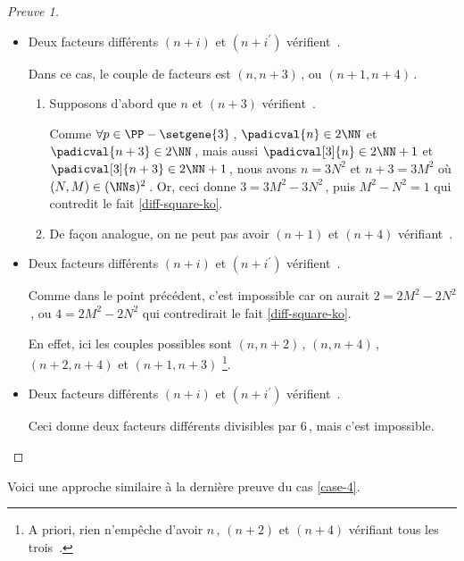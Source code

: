 \begin{proof}[Preuve 1]
\begin{itemize}
    	\medskip
		\item Deux facteurs différents $(n+i)$ et $(n+i^\prime)$ vérifient \,.
		
		\smallskip
		\noindent
		Dans ce cas, le couple de facteurs est $(n, n + 3)$\,, ou $(n + 1, n + 4)$\,.    
		\begin{enumerate}
			\item Supposons d'abord que $n$ et $(n+3)$ vérifient \,.
			
			\noindent
			Comme $\forall p \in \PP - \setgene{3}$\,, $\padicval{n} \in 2 \NN$ et $\padicval{n + 3} \in 2 \NN$\,,
			mais aussi $\padicval[3]{n} \in 2 \NN + 1$ et $\padicval[3]{n + 3} \in 2 \NN + 1$\,,
			nous avons $n = 3 N^2$ et $n+3 = 3 M^2$ où $(N, M) \in ( \NNs )^2$\,.
			Or, ceci donne $3 = 3 M^2 - 3 N^2$\,, puis $M^2 - N^2 = 1$ qui contredit le fait \ref{diff-square-ko}.

			\item De façon analogue, on ne peut pas avoir $(n+1)$ et $(n+4)$ vérifiant \,.
		\end{enumerate}


    	\medskip
		\item Deux facteurs différents $(n+i)$ et $(n+i^\prime)$ vérifient \,.
		
		\smallskip
		\noindent
		Comme dans le point précédent, c'est impossible car on aurait $2 = 2 M^2 - 2 N^2$\,, ou $4 = 2 M^2 - 2 N^2$ qui contredirait le fait \ref{diff-square-ko}. 
		
		\smallskip
		
		\noindent
		En effet, ici les couples possibles sont $(n, n + 2)$\,, $(n, n + 4)$\,,  $(n + 2, n + 4)$ et $(n + 1, n + 3)$
		\footnote{
			A priori, rien n'empêche d'avoir $n$\,, $(n + 2)$ et $(n + 4)$ vérifiant tous les trois \,.
		}.


    	\medskip
		\item Deux facteurs différents $(n+i)$ et $(n+i^\prime)$ vérifient \,.
		
		\smallskip
		\noindent
		Ceci donne deux facteurs différents divisibles par $6$\,, mais c'est impossible. \qedhere
    \end{itemize}
\end{proof}




Voici une approche similaire à la dernière preuve du cas \ref{case-4}.
	
